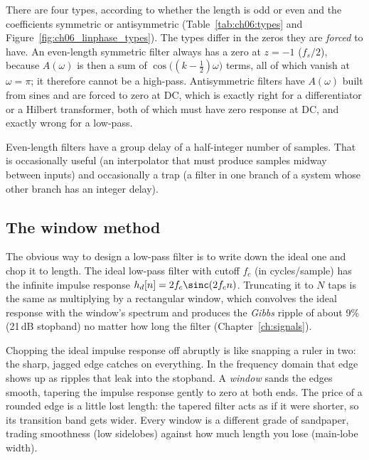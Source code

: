 There are four types, according to whether the length is odd or even and the coefficients
symmetric or antisymmetric (Table~\ref{tab:ch06:types} and Figure~\ref{fig:ch06_linphase_types}).
The types differ in the zeros they are \emph{forced} to have. An even-length symmetric filter always
has a zero at $z=-1$ ($f_s/2$), because $A(\omega)$ is then a sum of
$\cos\bigl((k-\tfrac12)\omega\bigr)$ terms, all of which vanish at $\omega=\pi$; it therefore cannot
be a high-pass. Antisymmetric filters have $A(\omega)$ built from sines and are forced to zero at
DC, which is exactly right for a differentiator or a Hilbert transformer, both of which must have
zero response at DC, and exactly wrong for a low-pass.



Even-length filters have a group delay of a half-integer number of samples. That is occasionally
useful (an interpolator that must produce samples midway between inputs) and occasionally a trap
(a filter in one branch of a system whose other branch has an integer delay).

\subsection{The window method}

The obvious way to design a low-pass filter is to write down the ideal one and chop it to length.
The ideal low-pass filter with cutoff $f_c$ (in cycles/sample) has the infinite impulse response
$h_d[n]=2f_c\sinc(2f_cn)$. Truncating it to $N$ taps is the same as multiplying by a rectangular
window, which convolves the ideal response with the window's spectrum and produces the \emph{Gibbs}
ripple of about 9\% (21\,dB stopband) no matter how long the filter (Chapter~\ref{ch:signals}).

\begin{analogy}
Chopping the ideal impulse response off abruptly is like snapping a ruler in two: the sharp, jagged
edge catches on everything. In the frequency domain that edge shows up as ripples that leak into
the stopband. A \emph{window} sands the edges smooth, tapering the impulse response gently to zero
at both ends. The price of a rounded edge is a little lost length: the tapered filter acts as if it
were shorter, so its transition band gets wider. Every window is a different grade of sandpaper,
trading smoothness (low sidelobes) against how much length you lose (main-lobe width).
\end{analogy}

